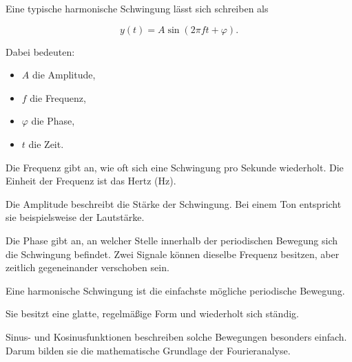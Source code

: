 Eine typische harmonische Schwingung lässt sich schreiben als

\[
y(t)=A\sin(2\pi f t+\varphi).
\]

Dabei bedeuten:

\begin{itemize}
	\item $A$ die Amplitude,
	\item $f$ die Frequenz,
	\item $\varphi$ die Phase,
	\item $t$ die Zeit.
\end{itemize}

Die Frequenz gibt an,
wie oft sich eine Schwingung pro Sekunde wiederholt.
Die Einheit der Frequenz ist das Hertz (Hz).

Die Amplitude beschreibt die Stärke der Schwingung.
Bei einem Ton entspricht sie beispielsweise der Lautstärke.

Die Phase gibt an,
an welcher Stelle innerhalb der periodischen Bewegung sich die Schwingung befindet.
Zwei Signale können dieselbe Frequenz besitzen,
aber zeitlich gegeneinander verschoben sein.

\begin{DidacticBox}
	\small
	\label{box:fourier-harmonische-schwingung}
	Eine harmonische Schwingung ist die einfachste mögliche periodische Bewegung.
	
	Sie besitzt eine glatte,
	regelmäßige Form
	und wiederholt sich ständig.
	
	Sinus- und Kosinusfunktionen beschreiben solche Bewegungen besonders einfach.
	Darum bilden sie die mathematische Grundlage der Fourieranalyse.
\end{DidacticBox}


